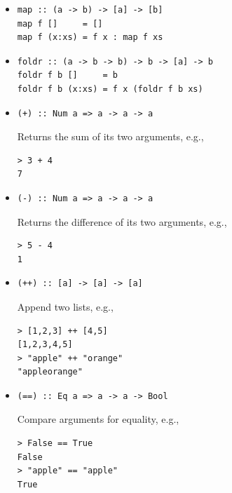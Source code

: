 \documentclass[addpoints]{exam}
\begin{document}
\begin{itemize}

\item
\begin{verbatim}
map :: (a -> b) -> [a] -> [b]
map f []     = []
map f (x:xs) = f x : map f xs
\end{verbatim}

\item
\begin{verbatim}
foldr :: (a -> b -> b) -> b -> [a] -> b
foldr f b []     = b
foldr f b (x:xs) = f x (foldr f b xs)
\end{verbatim}

\item
\begin{verbatim}
(+) :: Num a => a -> a -> a
\end{verbatim}
Returns the sum of its two arguments, e.g.,
\begin{verbatim}
> 3 + 4
7
\end{verbatim}

\item
\begin{verbatim}
(-) :: Num a => a -> a -> a
\end{verbatim}
Returns the difference of its two arguments, e.g.,
\begin{verbatim}
> 5 - 4
1
\end{verbatim}

\item
\begin{verbatim}
(++) :: [a] -> [a] -> [a]
\end{verbatim}
Append two lists, e.g.,
\begin{verbatim}
> [1,2,3] ++ [4,5]
[1,2,3,4,5]
> "apple" ++ "orange"
"appleorange"
\end{verbatim}

\item
\begin{verbatim}
(==) :: Eq a => a -> a -> Bool
\end{verbatim}
Compare arguments for equality, e.g., 
\begin{verbatim}
> False == True
False
> "apple" == "apple"
True
\end{verbatim}

\end{itemize}
\end{document}
